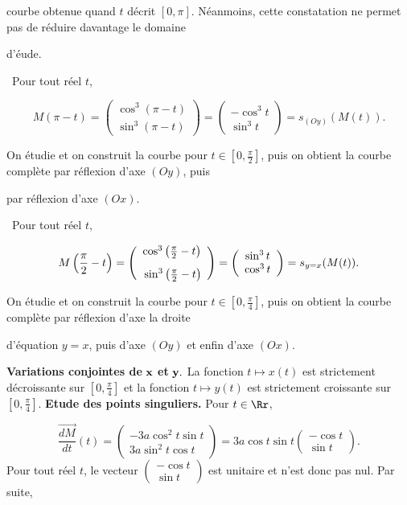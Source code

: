 {\begin{enumerate}
{courbe obtenue quand $t$ décrit $[0,\pi]$. Néanmoins, cette constatation ne permet pas de réduire davantage le domaine

d'éude.

\textbullet~Pour tout réel $t$,

$$M(\pi-t)=\left(\begin{array}{c}
\cos^3(\pi-t)\\
\sin^3(\pi-t)
\end{array}\right)=\left(\begin{array}{c}
-\cos^3t\\
\sin^3t
\end{array}\right)
=s_{(Oy)}(M(t)).$$

On étudie et on construit la courbe pour $t\in\left[0,\frac{\pi}{2}\right]$, puis on obtient la courbe complète par réflexion
d'axe $(Oy)$, puis

par réflexion d'axe $(Ox)$.

\textbullet~Pour tout réel $t$,

$$M\left(\frac{\pi}{2}-t\right)=\left(\begin{array}{c}
\cos^3\left(\frac{\pi}{2}-t\right)\\
\rule{0mm}{6mm}\sin^3\left(\frac{\pi}{2}-t\right)
\end{array}\right)=\left(\begin{array}{c}
\sin^3t\\
\cos^3t
\end{array}\right)
=s_{y=x}(M(t)).$$

On étudie et on construit la courbe pour $t\in\left[0,\frac{\pi}{4}\right]$, puis on obtient la courbe complète par réflexion
d'axe la droite

d'équation $y=x$, puis d'axe $(Oy)$ et enfin d'axe $(Ox)$.\rule{0mm}{5mm}

\textbf{Variations conjointes de} $\bf{x}$ \textbf{et} $\bf{y.}$ La fonction $t\mapsto x(t)$ est strictement
décroissante sur $\left[0,\frac{\pi}{4}\right]$ et la fonction $t\mapsto y(t)$ est strictement croissante sur
$\left[0,\frac{\pi}{4}\right]$.
\textbf{Etude des points singuliers.} Pour $t\in\Rr$,

$$\overrightarrow{\frac{dM}{dt}}(t)=\left(\begin{array}{c}
-3a\cos^2t\sin t\\
3a\sin^2t\cos t
\end{array}\right)=3a\cos t\sin t\left(\begin{array}{c}
-\cos t\\
\sin t
\end{array}\right).$$
Pour tout réel $t$, le vecteur $\left(\begin{array}{c}
-\cos t\\
\sin t
\end{array}\right)$ est unitaire et n'est donc pas nul. Par suite,

}
\end{enumerate}}
